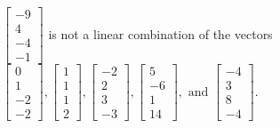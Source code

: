 \begin{exercise}
\begin{exerciseStatement}
  \end{exerciseStatement}
  \begin{exerciseAnswer}
   \(\left[\begin{array}{c}
-9 \\
4 \\
-4 \\
-1
\end{array}\right]\) 
  	 is not  
	a linear combination of the vectors \(\left[\begin{array}{c}
0 \\
1 \\
-2 \\
-2
\end{array}\right] , \left[\begin{array}{c}
1 \\
1 \\
1 \\
2
\end{array}\right] , \left[\begin{array}{c}
-2 \\
2 \\
3 \\
-3
\end{array}\right] , \left[\begin{array}{c}
5 \\
-6 \\
1 \\
14
\end{array}\right] , \text{ and } \left[\begin{array}{c}
-4 \\
3 \\
8 \\
-4
\end{array}\right]\).

	
  


  \end{exerciseAnswer}
\end{exercise}